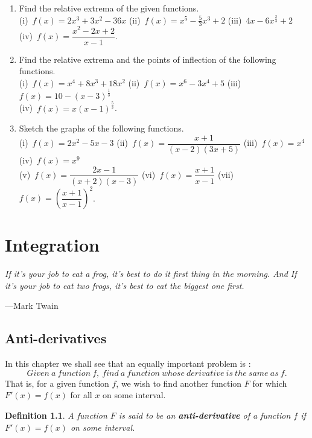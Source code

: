 \documentclass[titlepage,a4paper,12pt]{report}
\newtheorem{definition}{Definition}[section]
\begin{document}
\begin{enumerate}
\begin{itemize}
 \item[(iii)] $\dfrac{x-1}{x}<\ln x <x-1$ for $x>1$.
 \end{itemize}
\item Find the relative extrema of the given functions.\\
(i)\, $f(x)=2x^3+3x^2-36x$ \quad (ii)\, $f(x)=x^5-\frac{5}{3}x^3+2$ \quad (iii)\, $4x-6x^{\frac{2}{3}}+2$ \\ (iv)\, $f(x)=\dfrac{x^2-2x+2}{x-1}$.
\item Find the relative extrema and the points of inflection of the following functions.\\
(i)\, $f(x)=x^4+8x^3+18x^2$ \quad (ii)\, $f(x)=x^6-3x^4+5$ \quad (iii)\, $f(x)=10-(x-3)^{\frac{1}{3}}$ \\
(iv)\, $f(x)=x(x-1)^{\frac{5}{2}}$.
\item Sketch the graphs of the following functions.\\
(i)\, $f(x)=2x^2-5x-3$ \quad (ii)\, $f(x)=\dfrac{x+1}{(x-2)(3x+5)}$ \quad (iii)\, $f(x)=x^4$ \quad (iv)\, $f(x)=x^9$\\
(v)\, $f(x)=\dfrac{2x-1}{(x+2)(x-3)}$ \quad (vi)\, $f(x)=\dfrac{x+1}{x-1}$ \quad (vii)\, $f(x)=\left(\dfrac{x+1}{x-1}\right)^2$.
\end{enumerate}

\chapter{Integration}
\begin{center}
	\small{\parbox{18cm}{
		\begin{raggedright}
		{\small
		\textit{If it's your job to eat a frog, it's best to do it first thing in the morning. And If it's your job to eat two frogs, it's best to eat the biggest one first.}
 }
 
				\vspace{.5cm}\hfill{---Mark Twain}
		\end{raggedright}
	}
} 
\end{center}
\section{Anti-derivatives}
In this chapter we shall see that an equally important problem is :
\begin{equation*}
Given~ a~ function~ f,~ find~ a~ function~ whose~ derivative~ is~ the~ same~ as~ f.
\end{equation*}
That is, for a given function $f$, we wish to find another function $F$ for which $F'(x)=f(x)$ for all $x$ on some interval.
\begin{definition}
A function $F$ is said to be an \textbf{anti-derivative} of a function $f$ if $F'(x)=f(x)$ on some interval.
\end{definition}
\end{document}
